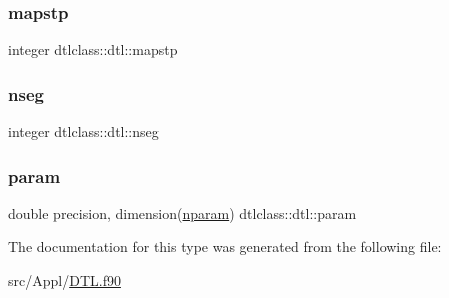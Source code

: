 \mbox{\label{structdtlclass_1_1dtl_ad89c7805074fee80c05af3ae3861cb87}} 
\subsubsection{\texorpdfstring{mapstp}{mapstp}}
{\footnotesize\ttfamily integer dtlclass\+::dtl\+::mapstp}

\mbox{\label{structdtlclass_1_1dtl_ab0c5195ab0993ee3107484257b94cfe5}} 
\subsubsection{\texorpdfstring{nseg}{nseg}}
{\footnotesize\ttfamily integer dtlclass\+::dtl\+::nseg}

\mbox{\label{structdtlclass_1_1dtl_a95bc1c81e12444e39d8ea61b6e67ae34}} 
\subsubsection{\texorpdfstring{param}{param}}
{\footnotesize\ttfamily double precision, dimension(\mbox{\hyperlink{namespacedtlclass_adf04761c96168c3dc492c89c72194cea}{nparam}}) dtlclass\+::dtl\+::param}



The documentation for this type was generated from the following file\+:\begin{DoxyCompactItemize}
\item 
src/\+Appl/\mbox{\hyperlink{_d_t_l_8f90}{D\+T\+L.\+f90}}\end{DoxyCompactItemize}
